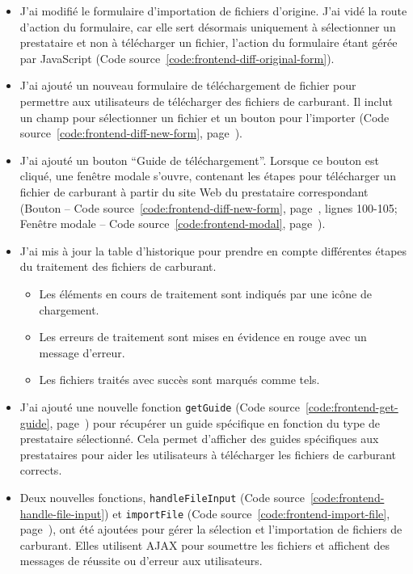 \begin{itemize}
    \item J'ai modifié le formulaire d'importation de fichiers d'origine. J'ai vidé la route d'action du formulaire, car elle sert désormais uniquement à sélectionner un prestataire et non à télécharger un fichier, l'action du formulaire étant gérée par JavaScript (Code source~\ref{code:frontend-diff-original-form}).
    \item J'ai ajouté un nouveau formulaire de téléchargement de fichier pour permettre aux utilisateurs de télécharger des fichiers de carburant. Il inclut un champ pour sélectionner un fichier et un bouton pour l'importer (Code source~\ref{code:frontend-diff-new-form}, page~\pageref{code:frontend-diff-new-form}).
    \item J'ai ajouté un bouton \foreignquote{french}{Guide de téléchargement}. Lorsque ce bouton est cliqué, une fenêtre modale s'ouvre, contenant les étapes pour télécharger un fichier de carburant à partir du site Web du prestataire correspondant (Bouton -- Code source~\ref{code:frontend-diff-new-form}, page~\pageref{code:frontend-diff-new-form}, lignes 100-105; Fenêtre modale -- Code source~\ref{code:frontend-modal}, page~\pageref{code:frontend-modal}).
    \item J'ai mis à jour la table d'historique pour prendre en compte différentes étapes du traitement des fichiers de carburant.
          \begin{itemize}
              \item Les éléments en cours de traitement sont indiqués par une icône de chargement.
              \item Les erreurs de traitement sont mises en évidence en rouge avec un message d'erreur.
              \item Les fichiers traités avec succès sont marqués comme tels.
          \end{itemize}
    \item J'ai ajouté une nouvelle fonction \Verb|getGuide| (Code source~\ref{code:frontend-get-guide}, page~\pageref{code:frontend-get-guide}) pour récupérer un guide spécifique en fonction du type de prestataire sélectionné. Cela permet d'afficher des guides spécifiques aux prestataires pour aider les utilisateurs à télécharger les fichiers de carburant corrects.
    \item Deux nouvelles fonctions, \Verb|handleFileInput| (Code source~\ref{code:frontend-handle-file-input}) et \Verb|importFile| (Code source~\ref{code:frontend-import-file}, page~\pageref{code:frontend-import-file}), ont été ajoutées pour gérer la sélection et l'importation de fichiers de carburant. Elles utilisent AJAX pour soumettre les fichiers et affichent des messages de réussite ou d'erreur aux utilisateurs.

\end{itemize}
